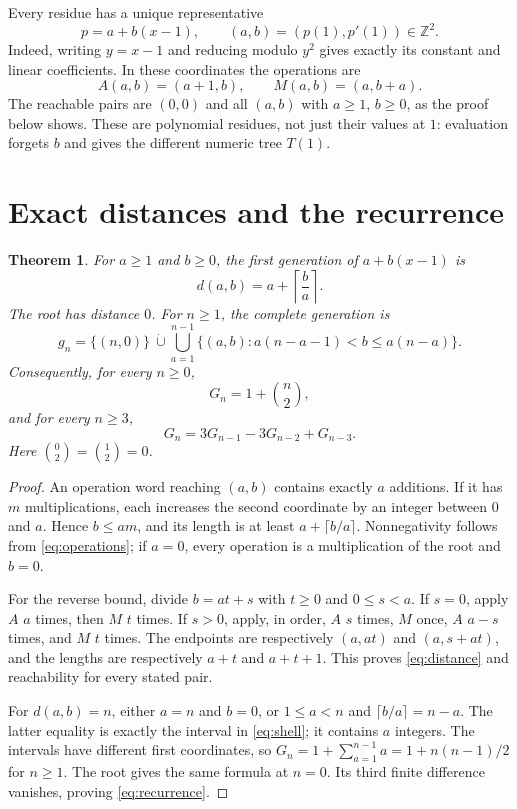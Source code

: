 \documentclass[11pt]{article}
\newtheorem{theorem}{Theorem}
\newcommand{\ZZ}{\mathbb Z}
\begin{document}
Every residue has a unique representative
\[
 p=a+b(x-1),\qquad (a,b)=(p(1),p'(1))\in\ZZ^2.
\]
Indeed, writing $y=x-1$ and reducing modulo $y^2$ gives exactly its
constant and linear coefficients. In these coordinates the operations are
\begin{equation}\label{eq:operations}
 A(a,b)=(a+1,b),\qquad M(a,b)=(a,b+a).
\end{equation}
The reachable pairs are $(0,0)$ and all $(a,b)$ with $a\geq1$, $b\geq0$,
as the proof below shows. These are polynomial residues, not just their
values at $1$: evaluation forgets $b$ and gives the different numeric
tree $T(1)$.

\section{Exact distances and the recurrence}
\begin{theorem}\label{thm:main}
For $a\geq1$ and $b\geq0$, the first generation of $a+b(x-1)$ is
\begin{equation}\label{eq:distance}
 d(a,b)=a+\left\lceil\frac ba\right\rceil.
\end{equation}
The root has distance $0$. For $n\geq1$, the complete generation is
\begin{equation}\label{eq:shell}
 g_n=\{(n,0)\}\ \dot\cup\!
 \bigcup_{a=1}^{n-1}\{(a,b):a(n-a-1)<b\leq a(n-a)\}.
\end{equation}
Consequently, for every $n\geq0$,
\begin{equation}\label{eq:count}
 G_n=1+\binom n2,
\end{equation}
and for every $n\geq3$,
\begin{equation}\label{eq:recurrence}
 G_n=3G_{n-1}-3G_{n-2}+G_{n-3}.
\end{equation}
Here $\binom02=\binom12=0$.
\end{theorem}
\begin{proof}
An operation word reaching $(a,b)$ contains exactly $a$ additions.
If it has $m$ multiplications, each increases the second coordinate by
an integer between $0$ and $a$. Hence $b\leq am$, and its length is
at least $a+\lceil b/a\rceil$. Nonnegativity follows from
\eqref{eq:operations}; if $a=0$, every operation is a multiplication of
the root and $b=0$.

For the reverse bound, divide $b=at+s$ with $t\geq0$ and $0\leq s<a$.
If $s=0$, apply $A$ $a$ times, then $M$ $t$ times. If $s>0$, apply,
in order, $A$ $s$ times, $M$ once, $A$ $a-s$ times, and $M$ $t$ times.
The endpoints are respectively $(a,at)$ and $(a,s+at)$, and the lengths
are respectively $a+t$ and $a+t+1$. This proves \eqref{eq:distance}
and reachability for every stated pair.

For $d(a,b)=n$, either $a=n$ and $b=0$, or $1\leq a<n$ and
$\lceil b/a\rceil=n-a$. The latter equality is exactly the interval
in \eqref{eq:shell}; it contains $a$ integers. The intervals have
different first coordinates, so
$G_n=1+\sum_{a=1}^{n-1}a=1+n(n-1)/2$ for $n\geq1$.
The root gives the same formula at $n=0$. Its third finite difference
vanishes, proving \eqref{eq:recurrence}.
\end{proof}
\end{document}
